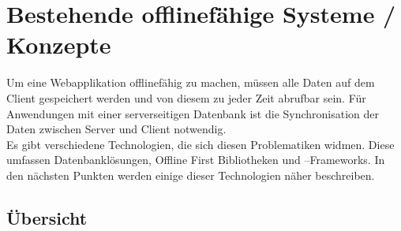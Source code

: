 %
%
\chapter{\label{chap:state}Bestehende offlinefähige Systeme / Konzepte}
Um eine Webapplikation offlinefähig zu machen, müssen alle Daten auf dem Client gespeichert werden und von diesem zu jeder Zeit abrufbar sein.
Für Anwendungen mit einer serverseitigen Datenbank ist die Synchronisation der Daten zwischen Server und Client notwendig.\\
Es gibt verschiedene Technologien, die sich diesen Problematiken widmen.
Diese umfassen Datenbanklösungen, Offline First Bibliotheken und --Frameworks. In den nächsten Punkten werden einige dieser Technologien näher beschreiben.
%
%

%
%

%
%

%
%

%
%

%
\clearpage
\section{Übersicht}
